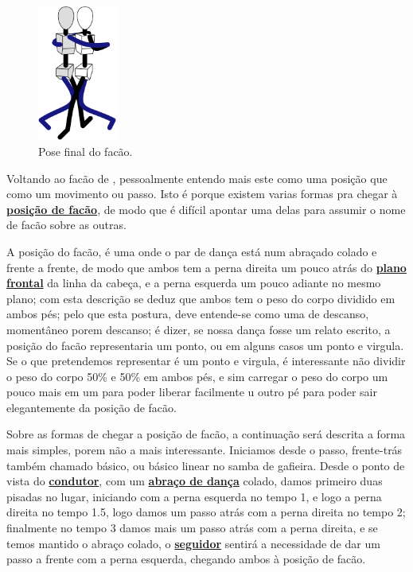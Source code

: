 \begin{figure}
  \vspace{-10pt}
  \centering
    \includegraphics[width=0.23\textwidth]{chapters/cap-historia-passos/facao.eps}
  \caption{Pose final do facão.}
  \label{fig:facaostickman}
  \vspace{-10pt}
\end{figure}
Voltando ao facão de \AnoLivro, pessoalmente entendo mais este como uma posição que 
como um movimento ou passo. 
Isto é porque existem varias formas pra chegar à \hyperref[def:facao-position]{\textbf{posição de facão}},
de modo que é difícil apontar uma delas para assumir o nome de facão sobre as outras.

A posição do facão, é uma onde o par de dança está num abraçado colado e frente a frente, 
de modo que ambos tem a perna direita um pouco atrás do \hyperref[def:PlanoFrontal]{\textbf{plano frontal}} da linha da cabeça,
e a perna esquerda um pouco adiante no mesmo plano; com esta descrição se deduz 
que ambos tem o peso do corpo dividido em ambos pés; pelo que esta postura,
deve entende-se como uma de descanso, momentâneo porem descanso;
é dizer, se nossa dança fosse um relato escrito, a posição do facão
representaria um ponto, ou em alguns casos um ponto e virgula.
Se o que pretendemos representar é um ponto e virgula, 
é interessante não dividir o peso do corpo 50\% e 50\% em ambos pés,
e sim carregar o peso do corpo um pouco mais em um 
para poder liberar facilmente u outro pé para poder sair elegantemente da posição de facão.  

Sobre as formas de chegar a posição de facão, a continuação será descrita a forma mais simples,
porem não a mais interessante. Iniciamos desde o passo, frente-trás também chamado básico, 
ou básico linear no samba de gafieira. Desde o ponto de vista do \hyperref[def:Condutor]{\textbf{condutor}}, 
com um \hyperref[def:abracodedanca]{\textbf{abraço de dança}} colado,
damos primeiro duas pisadas no lugar, iniciando com a perna esquerda no tempo 1, e logo a perna direita no tempo 1.5,
logo damos um passo atrás com a perna direita no tempo 2; 
finalmente no tempo 3 damos mais um passo atrás com a perna direita, 
e se temos mantido o abraço colado, 
o \hyperref[def:Seguidor]{\textbf{seguidor}} sentirá a necessidade de dar um passo a frente com a perna esquerda,
chegando ambos à posição de facão.  


